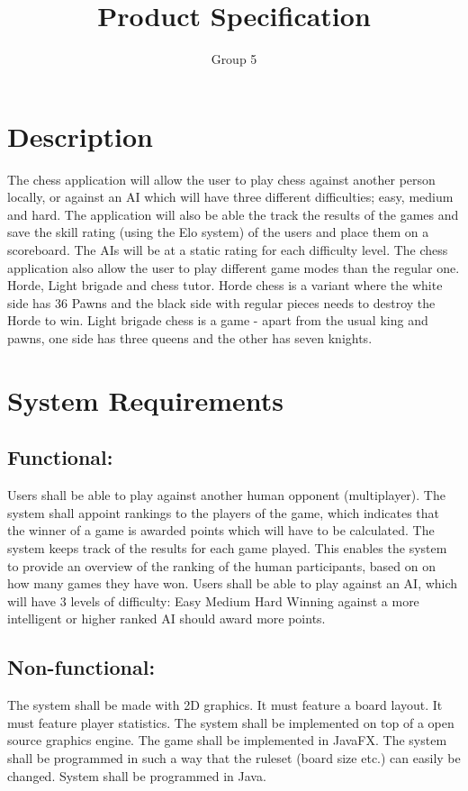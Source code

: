 \documentclass{article}
\title{Product Specification}
\author{Group 5}
\date{}
\begin{document}
    \maketitle

    \section{Description}
    The chess application will allow the user to play chess against another person locally, or against an AI which will have three different difficulties; easy, medium and hard. The application will also be able the track the results of the games and save the skill rating (using the Elo system) of the users and place them on a scoreboard. The AIs will be at a static rating for each difficulty level. The chess application also allow the user to play different game modes than the regular one. Horde, Light brigade and chess tutor. Horde chess is a variant where the white side has 36 Pawns and the black side with regular pieces needs to destroy the Horde to win. Light brigade chess is a game - apart from the usual king and pawns, one side has three queens and the other has seven knights.

    \section{System Requirements}
    \subsection{Functional:}
    \begin{outline}
          \1 Users shall be able to play against another human opponent (multiplayer).
          \1 The system shall appoint rankings to the players of the game, which indicates
             that the winner of a game is awarded points which will have to be calculated.
          \1 The system keeps track of the results for each game played.
          \2 This enables the system to provide an overview of the ranking of the human participants,
             based on on how many games they have won.
          \1 Users shall be able to play against an AI, which will have 3 levels of difficulty:
          \2 Easy
          \2 Medium
          \2 Hard
          \1 Winning against a more intelligent or higher ranked AI should award more points.
     \end{outline}

    \subsection{Non-functional:}
    \begin{outline}
          \1 The system shall be made with 2D graphics.
          \2 It must feature a board layout.
          \2 It must feature player statistics.
          \1 The system shall be implemented on top of a open source graphics engine.
          \2 The game shall be implemented in JavaFX.
          \1 The system shall be programmed in such a way that the ruleset (board size etc.) can easily be changed.
          \1 System shall be programmed in Java.
    \end{outline}
\end{document}
